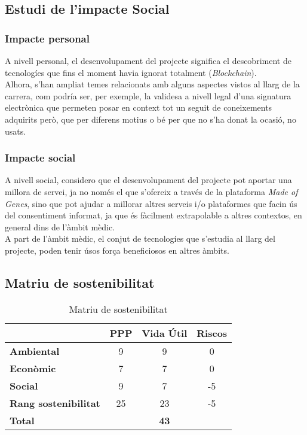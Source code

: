 \subsection{Estudi de l'impacte Social}
\subsubsection{Impacte personal}
A nivell personal, el desenvolupament del projecte significa el descobriment de tecnologíes que fins el moment havia ignorat totalment (\textit{Blockchain}).\\ 
\newline Alhora, s'han ampliat temes relacionats amb alguns aspectes vistos al llarg de la carrera, com podría ser, per exemple, la validesa a nivell legal d'una signatura electrònica que permeten posar en context tot un seguit de coneixements adquirits però, que per diferens motius o bé per que no s'ha donat la ocasió, no usats.

\subsubsection{Impacte social}
A nivell social, considero que el desenvolupament del projecte pot aportar una millora de servei, ja no només el que s'ofereix a través de la plataforma \textit{Made of Genes}, sino que pot ajudar a millorar altres serveis i/o plataformes que facin ús del consentiment informat, ja que és fàcilment extrapolable a altres contextos, en general dins de l'àmbit mèdic.\\
\newline A part de l'àmbit mèdic, el conjut de tecnologíes que s'estudia al llarg del projecte, poden tenir úsos força beneficiosos en altres àmbits.
\subsection{Matriu de sostenibilitat}
\begin{table}[h!]
  \centering
  \label{tab:matriu_sostenibilitat}
  \begin{tabular}{l c c c}
    	 & \textbf{PPP} & \textbf{Vida Útil} & \textbf{Riscos}\\
    	\midrule
    	\textbf{Ambiental}  & 9 & 9 & 0\\
    	\textbf{Econòmic}   & 7 & 7 & 0\\
    	\textbf{Social}     & 9 & 7 & -5 \\
    	\midrule
    	\textbf{Rang sostenibilitat} & 25 & 23 & -5\\
    	\bottomrule
    	\textbf{Total}      & & \textbf{43} & \\
  \end{tabular}
  \caption{Matriu de sostenibilitat}
\end{table}